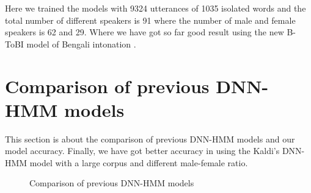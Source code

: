 \documentclass{standalone}
\begin{document}
Here we trained the models with 9324 utterances of 1035 isolated words and the total number of different speakers is 91 where the number of male and female speakers is 62 and 29.
Where we have got so far good result using the new B-ToBI model of Bengali intonation \cite{khan2016intonation}.

\section{Comparison of previous DNN-HMM models}
This section is about the comparison of previous DNN-HMM models and our model accuracy.
Finally, we have got better accuracy in using the Kaldi's DNN-HMM model with a large corpus and different male-female ratio.
\\
\begin{figure}[H]
 \centering
 \caption{Comparison of previous DNN-HMM models}
\label{fig:DNN-HMM_comparison}
\end{figure}
\end{document}
